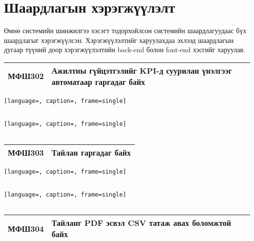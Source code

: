 \section{Шаардлагын хэрэгжүүлэлт}

Өмнө системийн шинжилгээ хэсэгт тодорхойлсон системийн шаардлагуудаас бүх шаардлагыг
хэрэгжүүлсэн. Хэрэгжүүлэлтийг харуулахдаа эхлээд шаардлагын дугаар түүний доор хэрэгжүүлэлтийн
back-end болон font-end хэсгийг харуулав.

\begin{table}[H]
    \centering
    \label{my-label-3}
    \begin{tabular}{|p{1.7cm}|p{12cm}|}
        \hline
          МФШ302 & Ажилтны гүйцэтгэлийг KPI-д суурилан үнэлгээг автоматаар гаргадаг байх\\\hline
    \end{tabular}
\end{table}

\begin{lstlisting}[language=, caption=, frame=single]
    
\end{lstlisting}

\begin{lstlisting}[language=, caption=, frame=single]
    
\end{lstlisting}





\begin{table}[H]
    \centering
    \label{my-label-3}
    \begin{tabular}{|p{1.7cm}|p{12cm}|}
        \hline
          МФШ303 & Тайлан гаргадаг байх\\ \hline
    \end{tabular}
\end{table}

\begin{lstlisting}[language=, caption=, frame=single]
    
\end{lstlisting}

\begin{lstlisting}[language=, caption=, frame=single]
    
\end{lstlisting}







\begin{table}[H]
    \centering
    \label{my-label-3}
    \begin{tabular}{|p{1.7cm}|p{12cm}|}
        \hline
          МФШ304 & Тайланг PDF эсвэл CSV татаж авах боломжтой байх\\ \hline
    \end{tabular}
\end{table}

